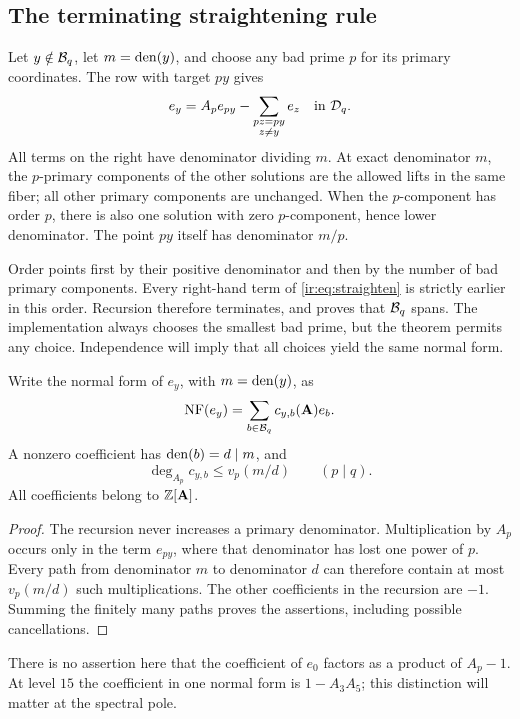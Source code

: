 \subsection{The terminating straightening rule}
Let $y\notin\mathcal B_q$, let $m=\operatorname{den}(y)$, and choose any bad prime $p$ for
its primary coordinates. The row with target $py$ gives
\begin{equation}\label{ir:eq:straighten}
 e_y=A_pe_{py}-\sum_{\substack{pz=py\\z\ne y}}e_z
       \quad\text{in }\mathcal D_q.
\end{equation}
All terms on the right have denominator dividing $m$.
At exact denominator $m$, the $p$-primary components of the other
solutions are the allowed lifts in the same fiber; all other primary
components are unchanged. When the $p$-component has order $p$, there
is also one solution with zero $p$-component, hence lower denominator.
The point $py$ itself has denominator $m/p$.

Order points first by their positive denominator and then by the number
of bad primary components. Every right-hand term of
\eqref{ir:eq:straighten} is strictly earlier in this order. Recursion
therefore terminates, and proves that $\mathcal B_q$ spans. The implementation
always chooses the smallest bad prime, but the theorem permits any
choice. Independence will imply that all choices yield the same
normal form.

\begin{proposition}\label{ir:prop:support}
Write the normal form of $e_y$, with $m=\operatorname{den}(y)$, as
\[
 \operatorname{NF}(e_y)=\sum_{b\in\mathcal B_q}c_{y,b}(\mathbf A)e_b.
\]
A nonzero coefficient has $\operatorname{den}(b)=d\mid m$, and
\begin{equation}\label{ir:eq:degree-bound}
 \deg_{A_p}c_{y,b}\le v_p(m/d)\qquad(p\mid q).
\end{equation}
All coefficients belong to $\mathbb Z[\mathbf A]$.
\end{proposition}
\begin{proof}
The recursion never increases a primary denominator. Multiplication by
$A_p$ occurs only in the term $e_{py}$, where that denominator has
lost one power of $p$. Every path from denominator $m$ to denominator
$d$ can therefore contain at most $v_p(m/d)$ such multiplications.
The other coefficients in the recursion are $-1$. Summing the finitely
many paths proves the assertions, including possible cancellations.
\end{proof}

There is no assertion here that the coefficient of $e_0$ factors as a
product of $A_p-1$. At level $15$ the coefficient in one normal form is
$1-A_3A_5$; this distinction will matter at the spectral pole.

